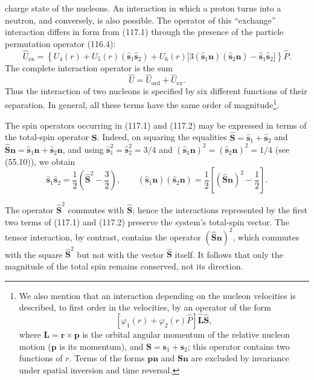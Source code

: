 charge state of the nucleons. An interaction in which a proton turns into a
neutron, and conversely, is also possible. The operator of this ``exchange''
interaction differs in form from (117.1) through the presence of the particle
permutation operator (116.4):
\begin{equation}
 \hat U_{\text{ex}}=\left\{U_4(r)+U_5(r)
 (\hat{\mathbf s}_1\hat{\mathbf s}_2)+U_6(r)
 \bigl[3(\hat{\mathbf s}_1\mathbf n)(\hat{\mathbf s}_2\mathbf n)
 -\hat{\mathbf s}_1\hat{\mathbf s}_2\bigr]\right\}\hat P.
 \tag{117.2}
\end{equation}
The complete interaction operator is the sum
\begin{equation}
 \hat U=\hat U_{\text{ord}}+\hat U_{\text{ex}}.
 \tag{117.3}
\end{equation}
Thus the interaction of two nucleons is specified by six different functions
of their separation. In general, all these terms have the same order of
magnitude\footnote{We also mention that an interaction depending on the
nucleon velocities is described, to first order in the velocities, by an
operator of the form
\[
 [\varphi_1(r)+\varphi_2(r)\hat P]\hat{\mathbf L}\hat{\mathbf S},
\]
where $\mathbf L=\mathbf r\times\mathbf p$ is the orbital angular momentum of
the relative nucleon motion ($\mathbf p$ is its momentum), and $\mathbf
S=\mathbf s_1+\mathbf s_2$; this operator contains two functions of $r$. Terms
of the forms $\mathbf p\mathbf n$ and $\mathbf S\mathbf n$ are excluded by
invariance under spatial inversion and time reversal.}.

The spin operators occurring in (117.1) and (117.2) may be expressed in terms
of the total-spin operator $\mathbf S$. Indeed, on squaring the equalities
$\hat{\mathbf S}=\hat{\mathbf s}_1+\hat{\mathbf s}_2$ and
$\hat{\mathbf S}\mathbf n=\hat{\mathbf s}_1\mathbf n+
\hat{\mathbf s}_2\mathbf n$, and using
$\hat{\mathbf s}_1^2=\hat{\mathbf s}_2^2=3/4$ and
$(\hat{\mathbf s}_1\mathbf n)^2=(\hat{\mathbf s}_2\mathbf n)^2=1/4$
(see (55.10)), we obtain
\begin{equation}
 \hat{\mathbf s}_1\hat{\mathbf s}_2
 =\frac12\left(\hat{\mathbf S}^2-\frac32\right),\qquad
 (\hat{\mathbf s}_1\mathbf n)(\hat{\mathbf s}_2\mathbf n)
 =\frac12\left[(\hat{\mathbf S}\mathbf n)^2-\frac12\right].
 \tag{117.4}
\end{equation}

The operator $\hat{\mathbf S}^2$ commutes with $\hat{\mathbf S}$; hence the
interactions represented by the first two terms of (117.1) and (117.2)
preserve the system's total-spin vector. The tensor interaction, by contrast,
contains the operator $(\hat{\mathbf S}\mathbf n)^2$, which commutes with the
square $\hat{\mathbf S}^2$ but not with the vector $\hat{\mathbf S}$ itself.
It follows that only the magnitude of the total spin remains conserved, not
its direction.

